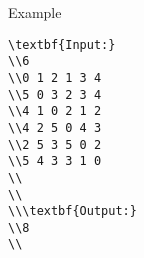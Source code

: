 Example
\begin{verbatim}
\textbf{Input:}
\\6
\\0 1 2 1 3 4 
\\5 0 3 2 3 4 
\\4 1 0 2 1 2 
\\4 2 5 0 4 3 
\\2 5 3 5 0 2 
\\5 4 3 3 1 0 
\\
\\
\\\textbf{Output:}
\\8
\\\end{verbatim}